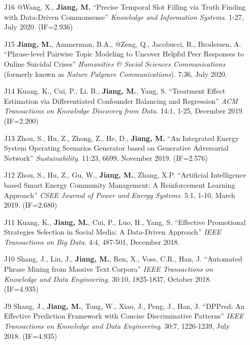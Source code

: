 \documentclass[10pt]{article}
\newenvironment{myindentpar}[1]%
{\begin{list}{}%
         {\setlength{\leftmargin}{#1}}%
         \item[]%
}
{\end{list}}
\newcounter{list}
\begin{document}
\begin{myindentpar}{0.00cm}
\begin{enumerate}[leftmargin=.5cm]
\item[J16] @Wang, X., \textbf{Jiang, M.} ``Precise Temporal Slot Filling via Truth Finding with Data-Driven Commonsense'' \textit{Knowledge and Information Systems}. 1-27, July 2020. (IF=2.936)

\item[J15] \textbf{Jiang, M.}, Ammerman, B.A., @Zeng, Q., Jacobucci, R., Brodersen, A. ``Phrase-level Pairwise Topic Modeling to Uncover Helpful Peer Responses to Online Suicidal Crises'' \textit{Humanities \& Social Sciences Communications} (formerly known as \textit{Nature Palgrave Communications}). 7:36, July 2020.

\item[J14] Kuang, K., Cui, P., Li, B., \textbf{Jiang, M.}, Yang, S. ``Treatment Effect Estimation via Differentiated Confounder Balancing and Regression'' \textit{ACM Transactions on Knowledge Discovery from Data}. 14:1, 1-25, December 2019. (IF=2.200)
	
\item[J13] Zhou, S., Hu, Z., Zhong, Z., He, D., \textbf{Jiang, M.} ``An Integrated Energy System Operating Scenarios Generator based on Generative Adversarial Network'' \textit{Sustainability}. 11:23, 6699, November 2019. (IF=2.576)

\item[J12] Zhou, S., Hu, Z., Gu, W., \textbf{Jiang, M.}, Zhang, X.P. ``Artificial Intelligence based Smart Energy Community Management: A Reinforcement Learning Approach'' \textit{CSEE Journal of Power and Energy Systems}. 5:1, 1-10, March 2019. (IF=2.680)

\item[J11] Kuang, K., \textbf{Jiang, M.}, Cui, P., Luo, H., Yang, S. ``Effective Promotional Strategies Selection in Social Media: A Data-Driven Approach'' \textit{IEEE Transactions on Big Data}. 4:4, 487-501, December 2018.

\item[J10] Shang, J., Liu, J., \textbf{Jiang, M.}, Ren, X., Voss, C.R., Han, J. ``Automated Phrase Mining from Massive Text Corpora'' \textit{IEEE Transactions on Knowledge and Data Engineering}. 30:10, 1825-1837, October 2018. (IF=4.935)

\item[J9] Shang, J., \textbf{Jiang, M.}, Tong, W., Xiao, J., Peng, J., Han, J. ``DPPred: An Effective Prediction Framework with Concise Discriminative Patterns'' \textit{IEEE Transactions on Knowledge and Data Engineering}. 30:7, 1226-1239, July 2018. (IF=4.935)


\end{enumerate}
\end{myindentpar}
\end{document}

